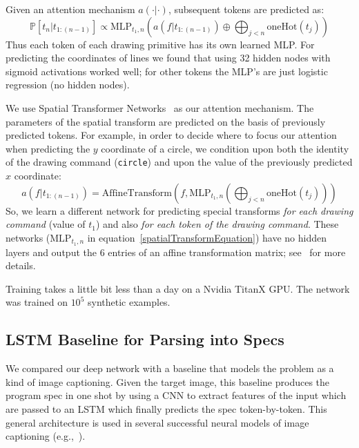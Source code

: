 \documentclass{article}
\newcommand{\probability}{\mathds{P}} %
\theoremstyle{definition}
\begin{document}
Given an attention mechanism $a(\cdot | \cdot)$, subsequent tokens are predicted as:
\begin{equation}
  \probability [t_n|t_{1:(n - 1)}]\propto \text{MLP}_{t_1,n}(a(f|t_{1:(n - 1)}) \oplus \bigoplus_{j < n} \text{oneHot}(t_j))\label{discreteTokenPrediction}
\end{equation}
Thus each token of each drawing primitive has its own learned MLP.
For predicting the coordinates of lines we found that using 32 hidden nodes with sigmoid activations worked well;
for other tokens the MLP's are just logistic regression (no hidden nodes).

We use Spatial Transformer Networks~\cite{jaderberg2015spatial}
as our attention mechanism.
The parameters of the spatial transform are predicted on the basis of previously predicted tokens.
For example, in order to decide where to focus our attention when predicting the $y$ coordinate of a circle,
we condition upon both the identity of the drawing command (\verb|circle|) and upon the value of the previously predicted $x$ coordinate:
\begin{equation}
  a(f|t_{1:(n - 1)}) = \text{AffineTransform}(f, \text{MLP}_{t_1,n}(\bigoplus_{j < n}\text{oneHot}(t_j)))
  \label{spatialTransformEquation}
\end{equation}
So, we learn a different network for predicting special transforms
\emph{for each drawing command} (value of $t_1$) and also \emph{for each token of the drawing command}.
These networks ($\text{MLP}_{t_1,n}$ in equation~\ref{spatialTransformEquation}) have no hidden layers and
output the 6 entries of an affine transformation matrix; see~\cite{jaderberg2015spatial}
for more details.

Training takes a little bit less than a day on a Nvidia TitanX GPU.
The network was trained on $10^5$ synthetic examples.

\subsection{LSTM Baseline for Parsing into Specs}\label{captioningBaseline}
We  compared our deep network with a baseline that models the problem as a kind of image captioning.
Given the target image, this baseline produces the program spec in one shot by
using a CNN to extract features of the input which are passed to an LSTM which finally predicts
the spec token-by-token.
This general architecture is used in several successful neural models of image captioning (e.g.,~\cite{vinyals2015show}).
\end{document}
